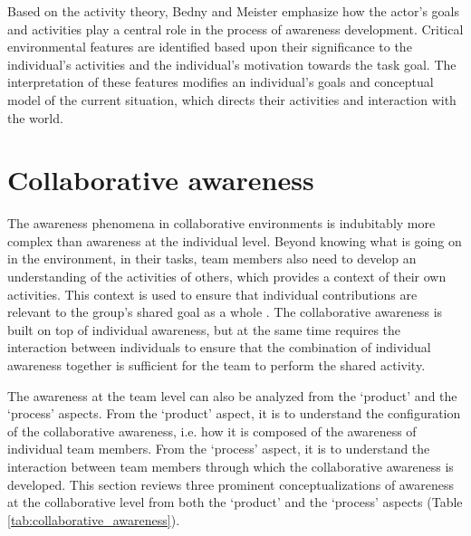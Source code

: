 Based on the activity theory, Bedny and Meister emphasize how the actor's goals and activities play a central role in the process of awareness development. Critical environmental features are identified based upon their significance to the individual's activities and the individual’s motivation towards the task goal. The interpretation of these features modifies an individual’s goals and conceptual model of the current situation, which directs their activities and interaction with the world.

\section{Collaborative awareness} %
\label{sec:awareness_in_collaboration}
The awareness phenomena in collaborative environments is indubitably more complex than awareness at the individual level. Beyond knowing what is going on in the environment, in their tasks, team members also need to develop an understanding of the activities of others, which provides a context of their own activities. This context is used to ensure that individual contributions are relevant to the group's shared goal as a whole \cite{dourish1992awareness}. The collaborative awareness is built on top of individual awareness, but at the same time requires the interaction between individuals to ensure that the combination of individual awareness together is sufficient for the team to perform the shared activity.

The awareness at the team level can also be analyzed from the `product' and the `process' aspects. From the `product' aspect, it is to understand the configuration of the collaborative awareness, i.e. how it is composed of the awareness of individual team members. From the `process' aspect, it is to understand the interaction between team members through which the collaborative awareness is developed. This section reviews three prominent conceptualizations of awareness at the collaborative level from both the `product' and the `process' aspects (Table \ref{tab:collaborative_awareness}).

